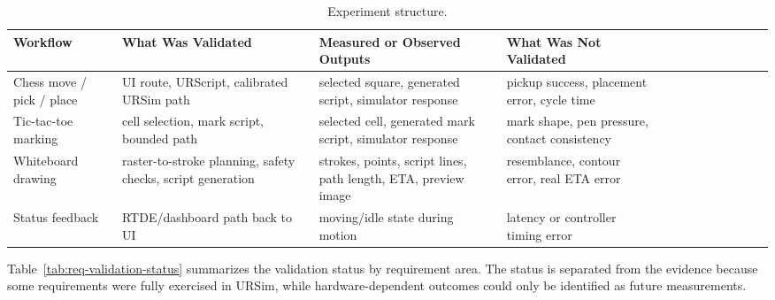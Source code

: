 \documentclass[12pt]{article}
\newcommand{\tablegridon}{\arrayrulecolor{black!35}}
\newcommand{\tablegridoff}{\arrayrulecolor{black}}
\newcommand{\tabrowsep}{\\[0.12em]\hline}
\begin{document}
\vspace{0.5 em}

\begin{table}[H]
\centering
\caption{Experiment structure.}
\label{tab:experiment-structure}
\small
\tablegridon
\begin{tabularx}{\textwidth}{|L{3.0cm}|L{3.7cm}|L{3.6cm}|Y|}
\toprule
Workflow & What Was Validated & Measured or Observed Outputs & What Was Not Validated \\
\midrule
Chess move / pick / place & UI route, URScript, calibrated URSim path & selected square, generated script, simulator response & pickup success, placement error, cycle time \tabrowsep
Tic-tac-toe marking & cell selection, mark script, bounded path & selected cell, generated mark script, simulator response & mark shape, pen pressure, contact consistency \tabrowsep
Whiteboard drawing & raster-to-stroke planning, safety checks, script generation & strokes, points, script lines, path length, ETA, preview image & resemblance, contour error, real ETA error \tabrowsep
Status feedback & RTDE/dashboard path back to UI & moving/idle state during motion & latency or controller timing error \\
\bottomrule
\end{tabularx}
\tablegridoff
\end{table}

\vspace{0.5 em}

Table~\ref{tab:req-validation-status} summarizes the validation status by requirement area. The status is separated from the evidence because some requirements were fully exercised in URSim, while hardware-dependent outcomes could only be identified as future measurements.
\end{document}

